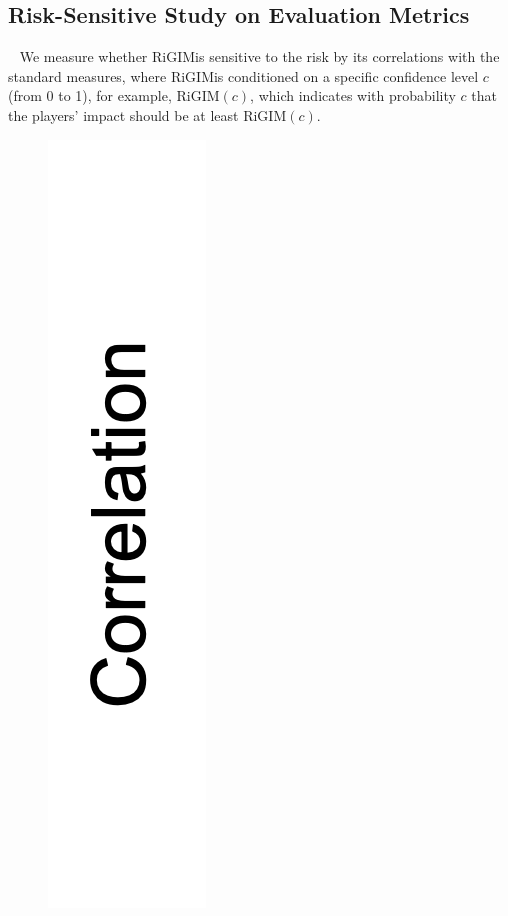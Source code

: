 \documentclass[letterpaper]{article} %
\newcommand{\confidence}{c}
\newcommand{\sys}{RiGIM}
\newcommand{\system}{\sys\;}
\begin{document}
\subsection{Risk-Sensitive Study on Evaluation Metrics  
}~\label{subsec:risk-sensitive-results}
We measure whether \system is sensitive to the risk by its correlations with the standard measures, where \system is conditioned on a specific confidence level $\confidence$ (from 0 to 1), for example, \sys$(c)$, which indicates with probability $\confidence$ that the players' impact should be at least \sys$(\confidence)$.
\begin{figure}[htbp]
\vspace{-0.1in}
    \begin{minipage}{0.01\textwidth}
    \centering
    \includegraphics[scale=0.12]{figures/correlation_y_label.png}

\end{minipage}
\end{figure}
\end{document}
